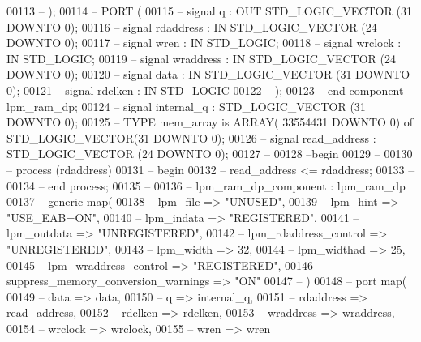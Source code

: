 \begin{DoxyCode}
00113 \textcolor{keyword}{--      );}
00114 \textcolor{keyword}{--    PORT (}
00115 \textcolor{keyword}{--    signal q : OUT STD\_LOGIC\_VECTOR (31 DOWNTO 0);}
00116 \textcolor{keyword}{--        signal rdaddress : IN STD\_LOGIC\_VECTOR (24 DOWNTO 0);}
00117 \textcolor{keyword}{--        signal wren : IN STD\_LOGIC;}
00118 \textcolor{keyword}{--        signal wrclock : IN STD\_LOGIC;}
00119 \textcolor{keyword}{--        signal wraddress : IN STD\_LOGIC\_VECTOR (24 DOWNTO 0);}
00120 \textcolor{keyword}{--        signal data : IN STD\_LOGIC\_VECTOR (31 DOWNTO 0);}
00121 \textcolor{keyword}{--        signal rdclken : IN STD\_LOGIC}
00122 \textcolor{keyword}{--      );}
00123 \textcolor{keyword}{--  end component lpm\_ram\_dp;}
00124 \textcolor{keyword}{--                signal internal\_q :  STD\_LOGIC\_VECTOR (31 DOWNTO 0);}
00125 \textcolor{keyword}{--                TYPE mem\_array is ARRAY( 33554431 DOWNTO 0) of STD\_LOGIC\_VECTOR(31 DOWNTO 0);}
00126 \textcolor{keyword}{--                signal read\_address :  STD\_LOGIC\_VECTOR (24 DOWNTO 0);}
00127 \textcolor{keyword}{--}
00128 \textcolor{keyword}{--begin}
00129 \textcolor{keyword}{--}
00130 \textcolor{keyword}{--  process (rdaddress)}
00131 \textcolor{keyword}{--  begin}
00132 \textcolor{keyword}{--      read\_address <= rdaddress;}
00133 \textcolor{keyword}{--}
00134 \textcolor{keyword}{--  end process;}
00135 \textcolor{keyword}{--}
00136 \textcolor{keyword}{--  lpm\_ram\_dp\_component : lpm\_ram\_dp}
00137 \textcolor{keyword}{--    generic map(}
00138 \textcolor{keyword}{--      lpm\_file => "UNUSED",}
00139 \textcolor{keyword}{--      lpm\_hint => "USE\_EAB=ON",}
00140 \textcolor{keyword}{--      lpm\_indata => "REGISTERED",}
00141 \textcolor{keyword}{--      lpm\_outdata => "UNREGISTERED",}
00142 \textcolor{keyword}{--      lpm\_rdaddress\_control => "UNREGISTERED",}
00143 \textcolor{keyword}{--      lpm\_width => 32,}
00144 \textcolor{keyword}{--      lpm\_widthad => 25,}
00145 \textcolor{keyword}{--      lpm\_wraddress\_control => "REGISTERED",}
00146 \textcolor{keyword}{--      suppress\_memory\_conversion\_warnings => "ON"}
00147 \textcolor{keyword}{--    )}
00148 \textcolor{keyword}{--    port map(}
00149 \textcolor{keyword}{--            data => data,}
00150 \textcolor{keyword}{--            q => internal\_q,}
00151 \textcolor{keyword}{--            rdaddress => read\_address,}
00152 \textcolor{keyword}{--            rdclken => rdclken,}
00153 \textcolor{keyword}{--            wraddress => wraddress,}
00154 \textcolor{keyword}{--            wrclock => wrclock,}
00155 \textcolor{keyword}{--            wren => wren}

\end{DoxyCode}
